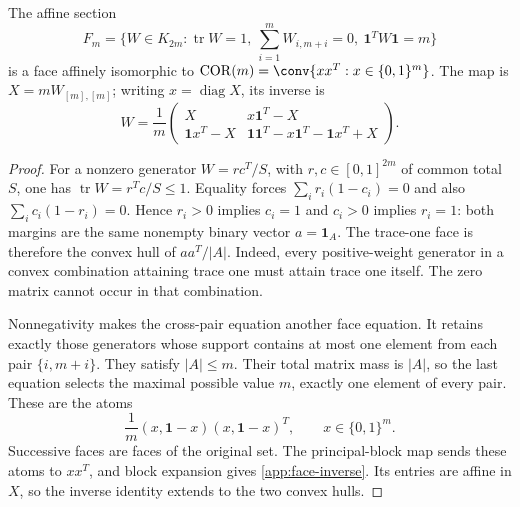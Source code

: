 \begin{theorem}\label{app:correlation-face}
The affine section
\[
 F_m=\{W\in K_{2m}:\operatorname{tr}W=1,
 \ \sum_{i=1}^mW_{i,m+i}=0,\ \mathbf1^TW\mathbf1=m\}
\]
is a face affinely isomorphic to
$\operatorname{COR}(m)=\conv\{xx^T:x\in\{0,1\}^m\}$.
The map is $X=mW_{[m],[m]}$; writing $x=\operatorname{diag}X$, its
inverse is
\begin{equation}
 W=\frac1m
 \begin{pmatrix}
 X&x\mathbf1^T-X\\
 \mathbf1x^T-X&\mathbf1\mathbf1^T-x\mathbf1^T-\mathbf1x^T+X
 \end{pmatrix}.
 \label{app:face-inverse}
\end{equation}
\end{theorem}
\begin{proof}
For a nonzero generator $W=rc^T/S$, with $r,c\in[0,1]^{2m}$ of
common total $S$, one has $\operatorname{tr}W=r^Tc/S\le1$.
Equality forces $\sum_i r_i(1-c_i)=0$ and also
$\sum_i c_i(1-r_i)=0$. Hence $r_i>0$ implies $c_i=1$ and
$c_i>0$ implies $r_i=1$: both margins are the same nonempty binary
vector $a=\mathbf1_A$. The trace-one face is therefore the convex
hull of $aa^T/|A|$. Indeed, every positive-weight generator in a
convex combination attaining trace one must attain trace one itself.
The zero matrix cannot occur in that combination.

Nonnegativity makes the cross-pair equation another face equation.
It retains exactly those generators whose support contains at most
one element from each pair $\{i,m+i\}$. They satisfy $|A|\le m$.
Their total matrix mass is $|A|$, so the last equation selects the
maximal possible value $m$, exactly one element of every pair.
These are the atoms
\[
 \frac1m(x,\mathbf1-x)(x,\mathbf1-x)^T,
 \qquad x\in\{0,1\}^m.
\]
Successive faces are faces of the original set. The principal-block
map sends these atoms to $xx^T$, and block expansion gives
\eqref{app:face-inverse}. Its entries are affine in $X$, so the inverse
identity extends to the two convex hulls.
\end{proof}

